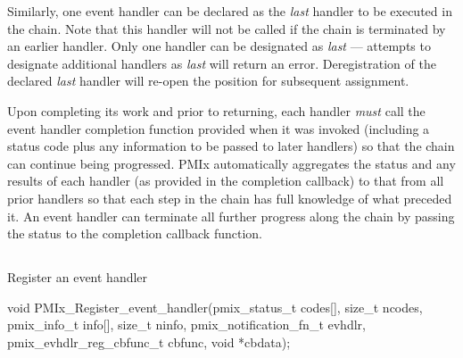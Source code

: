 Similarly, one event handler can be declared as the \textit{last} handler to be executed in the chain. Note that this handler will not be called if the chain is terminated by an earlier handler. Only one handler can be designated as \textit{last} --- attempts to designate additional handlers as \textit{last} will return an error. Deregistration of the declared \textit{last} handler will re-open the position for subsequent assignment.

Upon completing its work and prior to returning, each handler \textit{must} call the event handler completion function provided when it was invoked (including a status code plus any information to be passed to later handlers) so that the chain can continue being progressed. \ac{PMIx} automatically aggregates the status and any results of each handler (as provided in the completion callback) to that from all prior handlers so that each step in the chain has full knowledge of what preceded it. An event handler can terminate all further progress along the chain by passing the  status to the completion callback function.


\subsection{}

\summary

Register an event handler

\format

\cspecificstart
\begin{codepar}
void
PMIx_Register_event_handler(pmix_status_t codes[], size_t ncodes,
                            pmix_info_t info[], size_t ninfo,
                            pmix_notification_fn_t evhdlr,
                            pmix_evhdlr_reg_cbfunc_t cbfunc,
                            void *cbdata);
\end{codepar}
\cspecificend

\begin{arglist}
\end{arglist}

